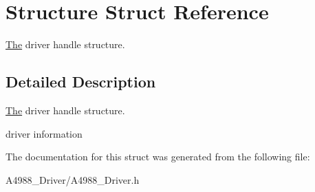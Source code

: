 \hypertarget{structStructure}{}\section{Structure Struct Reference}
\label{structStructure}


\hyperlink{structThe}{The} driver handle structure.  




\subsection{Detailed Description}
\hyperlink{structThe}{The} driver handle structure. 

driver information 

The documentation for this struct was generated from the following file\+:\begin{DoxyCompactItemize}
\item 
A4988\+\_\+\+Driver/A4988\+\_\+\+Driver.\+h\end{DoxyCompactItemize}
